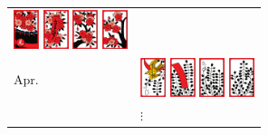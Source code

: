 \begin{frame}[c, fragile]
\begin{columns}
\begin{column}{0.55\textwidth}
\begin{table}[]
\begin{tabular}{ll}
{            \includegraphics[width=2em]{images/cards/B03}
            \includegraphics[width=2em]{images/cards/R03}
            \includegraphics[width=2em]{images/cards/J030}
            \includegraphics[width=2em]{images/cards/J031}
          } \\[1.5em]
          \parbox[][3.088em][c]{3em}{Apr.} & \parbox[][3.088em][c]{9em}{
            \includegraphics[width=2em]{images/cards/A04}
            \includegraphics[width=2em]{images/cards/R04}
            \includegraphics[width=2em]{images/cards/J040}
            \includegraphics[width=2em]{images/cards/J041}
          } \\
          \parbox[][3.088em][c]{3em}{} & \parbox[][3.088em][c]{9em}{\hspace{3em}$\vdots$} \\
        \end{tabular}
      \end{table}
    \end{column}


\end{columns}
\end{frame}
